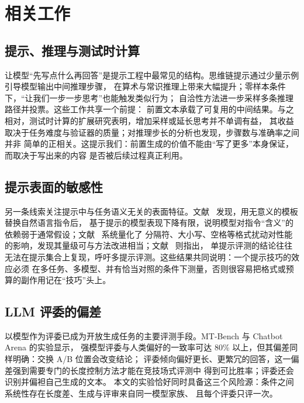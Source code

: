 \documentclass[UTF8,11pt,a4paper]{ctexart}
\begin{document}
\section{相关工作}

\subsection{提示、推理与测试时计算}

让模型“先写点什么再回答”是提示工程中最常见的结构。思维链提示通过少量示例引导模型输出中间推理步骤，
在算术与常识推理上带来大幅提升\cite{wei2022cot}；零样本条件下，“让我们一步一步思考”也能触发类似行为\cite{kojima2022}；
自洽性方法进一步采样多条推理路径并投票\cite{Wang2023selfconsistency}。这些工作共享一个前提：
前置文本承载了可复用的中间结果。与之相对，测试时计算的扩展研究表明，增加采样或延长思考并不单调有益，
其收益取决于任务难度与验证器的质量\cite{snell2025}；对推理步长的分析也发现，步骤数与准确率之间并非
简单的正相关\cite{jin2024}。这提示我们：前置生成的价值不能由“写了更多”本身保证，而取决于写出来的内容
是否被后续过程真正利用。

\subsection{提示表面的敏感性}

另一条线索关注提示中与任务语义无关的表面特征。文献~\cite{webson2022} 发现，用无意义的模板替换自然语言指令后，
基于提示的模型表现下降有限，说明模型对指令“含义”的依赖弱于通常假设；文献~\cite{sclar2024} 系统量化了
分隔符、大小写、空格等格式扰动对性能的影响，发现其量级可与方法改进相当；文献~\cite{mizrahi2024} 则指出，
单提示评测的结论往往无法在提示集合上复现，呼吁多提示评测。这些结果共同说明：一个提示技巧的效应必须
在多任务、多模型、并有恰当对照的条件下测量，否则很容易把格式或预算的副作用记在“技巧”头上。

\subsection{LLM 评委的偏差}

以模型作为评委已成为开放生成任务的主要评测手段。MT-Bench 与 Chatbot Arena 的实验显示，
强模型评委与人类偏好的一致率可达 80\% 以上\cite{zheng2023}，但其偏差同样明确：交换 A/B 位置会改变结论\cite{wang2024fair}；
评委倾向偏好更长、更繁冗的回答\cite{saito2023}，这一偏差强到需要专门的长度控制方法才能在竞技场式评测中
得到可比胜率\cite{dubois2024lc}；评委还会识别并偏袒自己生成的文本\cite{panickssery2024}。
本文的实验恰好同时具备这三个风险源：条件之间系统性存在长度差、生成与评审来自同一模型家族、
且每个评委只评一次。
\end{document}
